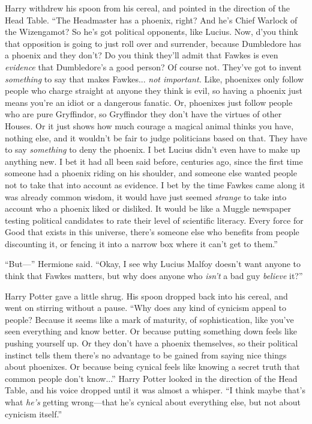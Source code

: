 Harry withdrew his spoon from his cereal, and pointed in the direction of the Head Table. “The Headmaster has a phoenix, right? And he’s Chief Warlock of the Wizengamot? So he’s got political opponents, like Lucius. Now, d’you think that opposition is going to just roll over and surrender, because Dumbledore has a phoenix and they don’t? Do you think they’ll admit that Fawkes is even \emph{evidence} that Dumbledore’s a good person? Of course not. They’ve got to invent \emph{something} to say that makes Fawkes... \emph{not important.} Like, phoenixes only follow people who charge straight at anyone they think is evil, so having a phoenix just means you’re an idiot or a dangerous fanatic. Or, phoenixes just follow people who are pure Gryffindor, so Gryffindor they don’t have the virtues of other Houses. Or it just shows how much courage a magical animal thinks you have, nothing else, and it wouldn’t be fair to judge politicians based on that. They have to say \emph{something} to deny the phoenix. I bet Lucius didn’t even have to make up anything new. I bet it had all been said before, centuries ago, since the first time someone had a phoenix riding on his shoulder, and someone else wanted people not to take that into account as evidence. I bet by the time Fawkes came along it was already common wisdom, it would have just seemed \emph{strange} to take into account who a phoenix liked or disliked. It would be like a Muggle newspaper testing political candidates to rate their level of scientific literacy. Every force for Good that exists in this universe, there’s someone else who benefits from people discounting it, or fencing it into a narrow box where it can’t get to them.”

“But—” Hermione said. “Okay, I see why Lucius Malfoy doesn’t want anyone to think that Fawkes matters, but why does anyone who \emph{isn’t} a bad guy \emph{believe} it?”

Harry Potter gave a little shrug. His spoon dropped back into his cereal, and went on stirring without a pause. “Why does any kind of cynicism appeal to people? Because it seems like a mark of maturity, of sophistication, like you’ve seen everything and know better. Or because putting something down feels like pushing yourself up. Or they don’t have a phoenix themselves, so their political instinct tells them there’s no advantage to be gained from saying nice things about phoenixes. Or because being cynical feels like knowing a secret truth that common people don’t know...” Harry Potter looked in the direction of the Head Table, and his voice dropped until it was almost a whisper. “I think maybe that’s what \emph{he’s} getting wrong—that he’s cynical about everything else, but not about cynicism itself.”

